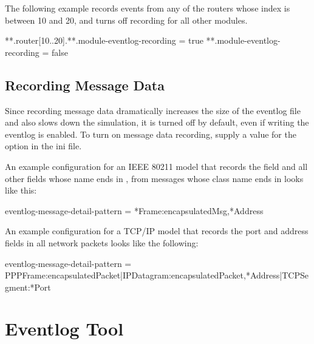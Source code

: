 The following example records events from any of the routers whose index is
between 10 and 20, and turns off recording for all other modules.

\begin{inifile}
**.router[10..20].**.module-eventlog-recording = true
**.module-eventlog-recording = false
\end{inifile}

\subsection{Recording Message Data}

Since recording message data dramatically increases the size of the
eventlog file and also slows down the simulation, it is turned off by
default, even if writing the eventlog is enabled. To turn on message data
recording, supply a value for the 
option in the ini file.



An example configuration for an IEEE 80211 model that records the  field
and all other fields whose name ends in , from messages whose class name ends in
 looks like this:

\begin{inifile}
eventlog-message-detail-pattern = *Frame:encapsulatedMsg,*Address
\end{inifile}

An example configuration for a TCP/IP model that records the port and address
fields in all network packets looks like the following:

\begin{inifile}
eventlog-message-detail-pattern =
 PPPFrame:encapsulatedPacket|IPDatagram:encapsulatedPacket,*Address|TCPSegment:*Port
\end{inifile}

%


\section{Eventlog Tool}

